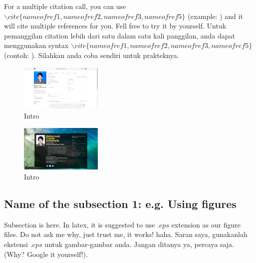 \documentclass[journal]{IEEEtran}
\begin{document}
\vfill
For a multiple citation call, you can use $\backslash cite\{nameofref1, nameofref2, nameofref3, nameofref5\}$ (example: \cite{nameofref1, nameofref2, nameofref3, nameofref5}) and it will cite multiple references for you. Fell free to try it by yourself. Untuk pemanggilan citation lebih dari satu dalam satu kali panggilan, anda dapat menggunakan syntax $\backslash cite\{nameofref1, nameofref2, nameofref3, nameofref5\}$ (contoh: \cite{nameofref1, nameofref2, nameofref3, nameofref5}). Silahkan anda coba sendiri untuk prakteknya.

%
%

\begin{figure}[H]
\centering
  \includegraphics[width=0.35\textwidth]{github}
\caption{Intro}
\label{fig:fig1a}
\end{figure}

\begin{figure}[H]
\centering
  \includegraphics[width=0.35\textwidth]{intro}
\caption{Intro}
\label{fig:fig1b}
\end{figure}

\subsection{Name of the subsection 1: e.g. Using figures}
Subsection is here. In latex, it is suggested to use $.eps$ extension as our figure files. Do not ask me why, just trust me, it works! haha. Saran saya, gunakanlah ekstensi $.eps$ untuk gambar-gambar anda. Jangan ditanya ya, percaya saja. (Why? Google it yourself!). 
\end{document}
